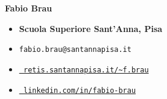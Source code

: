\documentclass[aspectratio=169, 9pt]{beamer}
\theoremstyle{definition}
\begin{document}
{\begin{frame}{}
\begin{minipage}[h]{0.6\textwidth}
  {\large\bf Fabio Brau}
  \vspace{5pt}
  \begin{itemize}
    \item[\faUniversity] {\bf Scuola Superiore Sant'Anna, Pisa}
    \item[\Letter] \texttt{fabio.brau@santannapisa.it}
    \item[\faGlobe] \href{http://retis.santannapisa.it/~f.brau/}{\tt %
                    retis.santannapisa.it/\textasciitilde f.brau}
    \item[\faLinkedin]
      \href{https://www.linkedin.com/in/fabio-brau}{\tt%
        linkedin.com/in/fabio-brau}
  \end{itemize}
  \end{minipage}
\end{frame}
}
\end{document}
